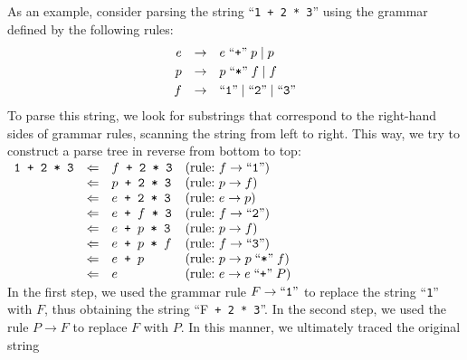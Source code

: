 As an example, consider parsing the string ``\texttt{1 + 2 * 3}'' using the grammar defined by the following rules:
\[ 
\begin{array}[t]{rcl}
  e & \rightarrow & e \;\mbox{``\texttt{+}''}\; p \;|\; p  \\[0.1cm]
  p & \rightarrow & p \;\mbox{``\texttt{*}''}\; f \;|\; f  \\[0.1cm]
  f & \rightarrow & \mbox{``\texttt{1}''} \;|\; \mbox{``\texttt{2}''} \;|\; \mbox{``\texttt{3}''} 
\end{array}
\]
To parse this string, we look for substrings that correspond to the right-hand sides of grammar rules, scanning the string from left to right. This way, we try to construct a parse tree in reverse from bottom to top:
\\[0.2cm]
\hspace*{0.3cm} 
$
\begin{array}[t]{lcll}
\texttt{1 + 2 * 3} & \Leftarrow & f \texttt{ + 2 * 3} 
                                & (\mbox{rule:\ }  f \rightarrow  \mbox{``\texttt{1}''}) \\
                   & \Leftarrow & p \texttt{ + 2 * 3} 
                                & (\mbox{rule:\ } p \rightarrow f) \\
                   & \Leftarrow & e \texttt{ + 2 * 3} 
                                & (\mbox{rule:\ }  e \rightarrow  p) \\
                   & \Leftarrow & e \texttt{ + } f \texttt{ * 3} 
                                & (\mbox{rule:\ } f \rightarrow  \mbox{``\texttt{2}''}) \\
                   & \Leftarrow & e \texttt{ + } p \texttt{ * 3} 
                                & (\mbox{rule:\ } p \rightarrow f) \\
                   & \Leftarrow & e \texttt{ + } p \texttt{ * } f 
                                & (\mbox{rule:\ } f \rightarrow \mbox{``\texttt{3}''}) \\
                   & \Leftarrow & e \texttt{ + } p & (\mbox{rule:\ } p \rightarrow p \;\mbox{``\texttt{*}''}\; f) \\
                   & \Leftarrow & e                & (\mbox{rule:\ } e \rightarrow e \;\mbox{``\texttt{+}''}\; P) 
\end{array}
$
\\[0.2cm]
In the first step, we used the grammar rule \(F \rightarrow \mbox{``\texttt{1}''}\) to replace the string ``\texttt{1}''
with \(F\), thus obtaining the string ``F\texttt{ + 2 * 3}''. In the second step, we used the rule \(P
\rightarrow F\) to replace \(F\) with \(P\). In this manner, we ultimately traced the original string
